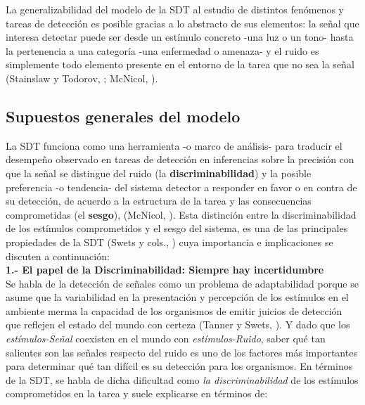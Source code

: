La generalizabilidad del modelo de la SDT al estudio de distintos fenómenos y tareas de detección es posible gracias a lo abstracto de sus elementos: la señal que interesa detectar puede ser desde un estímulo concreto -una luz o un tono- hasta la pertenencia a una categoría -una enfermedad o amenaza- y el ruido es simplemente todo elemento presente en el entorno de la tarea que no sea la señal (Stainslaw y Todorov, \citeyear{Stainslaw1999}; McNicol, \citeyear{McNicol1}).\\ 

\subsection{Supuestos generales del modelo}

La SDT funciona como una herramienta -o marco de análisis- para traducir el desempeño observado en tareas de detección en inferencias sobre la precisión con que la señal se distingue del ruido (la \textbf{discriminabilidad}) y la posible preferencia -o tendencia- del sistema detector a responder en favor o en contra de su detección, de acuerdo a la estructura de la tarea y las consecuencias comprometidas (el \textbf{sesgo}), (McNicol, \citeyear{McNicol1}). Esta distinción entre la discriminabilidad de los estímulos comprometidos y el sesgo del sistema, es una de las principales propiedades de la SDT (Swets y cols., \citeyear{Swets1961}) cuya importancia e implicaciones se discuten a continuación:\\

\textbf{1.- El papel de la Discriminabilidad: Siempre hay incertidumbre}\\

Se habla de la detección de señales como un problema de adaptabilidad porque se asume que la variabilidad en la presentación y percepción de los estímulos en el ambiente merma la capacidad de los organismos de emitir juicios de detección que reflejen el estado del mundo con certeza (Tanner y Swets, \citeyear{Tanner1954}). Y dado que los \textit{estímulos-Señal} coexisten en el mundo con \textit{estímulos-Ruido}, saber qué tan salientes son las señales respecto del ruido es uno de los factores más importantes para determinar qué tan difícil es su detección para los organismos. En términos de la SDT, se habla de dicha dificultad como \textit{la discriminabilidad} de los estímulos comprometidos en la tarea y suele explicarse en términos de:\\

